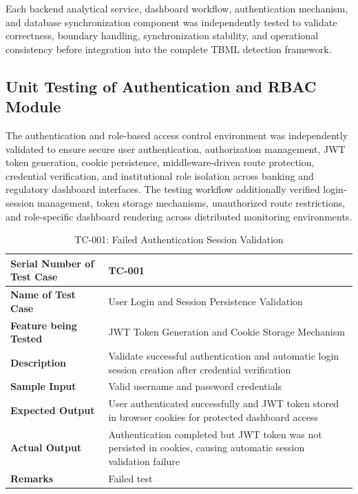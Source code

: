 Each backend analytical service, dashboard workflow, authentication mechanism, and database synchronization component was independently tested to validate correctness, boundary handling, synchronization stability, and operational consistency before integration into the complete TBML detection framework.

\subsection[Unit Testing of Authentication and RBAC Module]{\textbf{Unit Testing of Authentication and RBAC Module}}

The authentication and role-based access control environment was independently validated to ensure secure user authentication, authorization management, JWT token generation, cookie persistence, middleware-driven route protection, credential verification, and institutional role isolation across banking and regulatory dashboard interfaces. The testing workflow additionally verified login-session management, token storage mechanisms, unauthorized route restrictions, and role-specific dashboard rendering across distributed monitoring environments.

\renewcommand{\arraystretch}{1.3}


\begin{table}[H]
\centering
\caption{TC-001: Failed Authentication Session Validation}
\label{tab:auth_failed_test}
\vspace{0.2cm}
\begin{tabular}{|p{4.2cm}|p{9cm}|}
\hline
\textbf{Serial Number of Test Case} & TC-001 \\ \hline
\textbf{Name of Test Case} & User Login and Session Persistence Validation \\ \hline
\textbf{Feature being Tested} & JWT Token Generation and Cookie Storage Mechanism \\ \hline
\textbf{Description} & Validate successful authentication and automatic login session creation after credential verification \\ \hline
\textbf{Sample Input} & Valid username and password credentials \\ \hline
\textbf{Expected Output} & User authenticated successfully and JWT token stored in browser cookies for protected dashboard access \\ \hline
\textbf{Actual Output} & Authentication completed but JWT token was not persisted in cookies, causing automatic session validation failure \\ \hline
\textbf{Remarks} & Failed test \\ \hline
\end{tabular}
\end{table}

